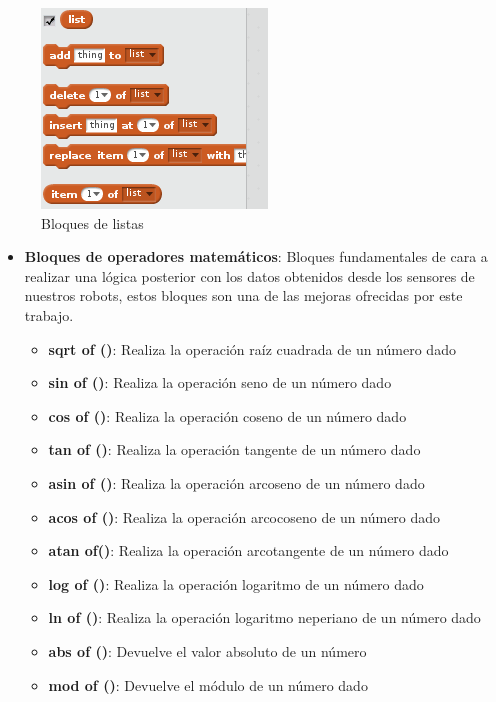 \begin{figure}[H]
\begin {minipage}{0.33\textwidth}
     	\centering
     	\includegraphics[scale=0.40]{img/bloques-listas.png}
     	\caption{Bloques de listas}
     	\label{fig:bloques-listas}
	\end{minipage}
\end{figure}

\begin{itemize}
\item \textbf{Bloques de operadores matemáticos}:
Bloques fundamentales de cara a realizar una lógica posterior con los datos obtenidos desde los sensores de nuestros robots, estos bloques son una de las mejoras ofrecidas por este trabajo.
	\begin{itemize}

    \item \textbf{sqrt of ()}: Realiza la operación raíz cuadrada de un número dado
    \item \textbf{sin of ()}: Realiza la operación seno de un número dado
    \item \textbf{cos of ()}: Realiza la operación coseno de un número dado
    \item \textbf{tan of ()}: Realiza la operación tangente de un número dado
    \item \textbf{asin of ()}: Realiza la operación arcoseno de un número dado
    \item \textbf{acos of ()}: Realiza la operación arcocoseno de un número dado
    \item \textbf{atan of()}: Realiza la operación arcotangente de un número dado
    \item \textbf{log of ()}: Realiza la operación logaritmo de un número dado
    \item \textbf{ln of ()}: Realiza la operación logaritmo neperiano de un número dado
    \item \textbf{abs of ()}: Devuelve el valor absoluto de un número
    \item \textbf{mod of ()}: Devuelve el módulo de un número dado
    \end{itemize}


\end{itemize}

